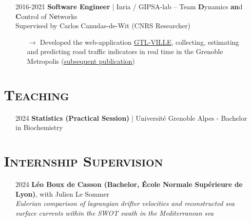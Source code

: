 \documentclass{article}
\begin{document}
\begin{itemize}
    \item[] 2016-2021 \tabto{2cm} \textbf{Software Engineer} $\vert$ Inria / GIPSA-lab – Team \textbf{D}ynamics \textbf{an}d \textbf{C}ontrol of N\textbf{e}tworks\\[.1 cm]
    \tabto{2cm} Supervised by Carlos Canudas-de-Wit (CNRS Researcher)
    \vspace{-.1cm}
    \begin{itemize}[left=2cm]
        \item[$\rightarrow$] Developed the web-application \href{https://gtlville.inrialpes.fr/}{GTL-VILLE}, collecting, estimating and predicting road traffic indicators in real time in the Grenoble Metropolis (\href{https://hal.science/hal-03694936}{subsequent publication})
    \end{itemize}
\end{itemize}

\section*{\textsc{Teaching}}
\begin{itemize}
    \item[] 2024 \tabto{2cm} \textbf{Statistics (Practical Session)} $\vert$ Université Grenoble Alpes - Bachelor in Biochemistry
\end{itemize}

\section*{\textsc{Internship Supervision}}
\begin{itemize}
    \item[] 2024 \tabto{2cm} \textbf{Léo Boux de Casson (Bachelor, École Normale Supérieure de Lyon)}, with Julien Le Sommer \\[.1 cm]
    \tabto{2cm} \textit{Eulerian comparison of lagrangian drifter velocities and reconstructed sea surface currents within the \tabto{2cm} SWOT swath in the Mediterranean sea}
\end{itemize}
\end{document}
